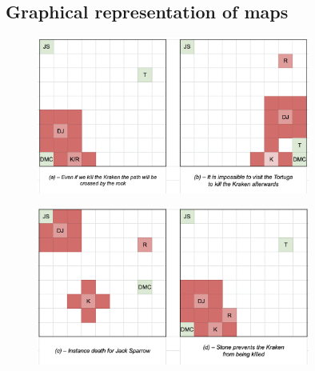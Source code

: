 \documentclass[a4paper,12pt]{article}
\begin{document}
\subsection{Graphical representation of maps}
\begin{figure}[h]
         \centering
         \includegraphics[width = 0.8\textwidth]{images/mapsab.png}
\end{figure}

\begin{figure}[h]
         \centering
         \includegraphics[width = 0.8\textwidth]{images/mapcd.png}
\end{figure}

\newpage
\end{document}
